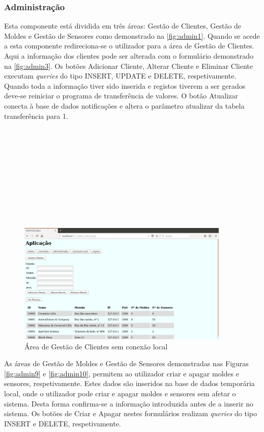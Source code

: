 \documentclass[11pt,twoside,a4paper]{report}
\begin{document}
\subsubsection{Administração}
Esta componente está dividida em três áreas: Gestão de Clientes, Gestão de Moldes e Gestão de Sensores como demonstrado na \autoref{fig:admin1}. Quando se acede a esta componente redireciona-se o utilizador para a área de Gestão de Clientes. Aqui a informação dos clientes pode ser alterada com o formulário demonstrado na \autoref{fig:admin3}. Os botões Adicionar Cliente, Alterar Cliente e Eliminar Cliente executam \textit{queries} do tipo INSERT, UPDATE e DELETE, respetivamente. Quando toda a informação tiver sido inserida e registos tiverem a ser gerados deve-se reiniciar o programa de transferência de valores. O botão Atualizar conecta à base de dados notificações e altera o parâmetro atualizar da tabela transferência para 1.\\
\\
\\
\\
\\
\\
\\
\\
\\
\\
\\
\begin{figure}[H]
	\begin{center}
		\includegraphics[width=0.9\textwidth]{administracao02} %
		\caption{Área de Gestão de Clientes sem conexão local}
		\label{fig:admin3}
	\end{center}
\end{figure}
\newpage
As áreas de Gestão de Moldes e Gestão de Sensores demonstradas nas Figuras \ref{fig:admin9} e \ref{fig:admin10}, permitem ao utilizador criar e apagar moldes e sensores, respetivamente. Estes dados são inseridos na base de dados temporária local, onde o utilizador pode criar e apagar moldes e sensores sem afetar o sistema. Desta forma confirma-se a informação introduzida antes de a inserir no sistema. Os botões de Criar e Apagar nestes formulários realizam \textit{queries} do tipo INSERT e DELETE, respetivamente.
\end{document}
